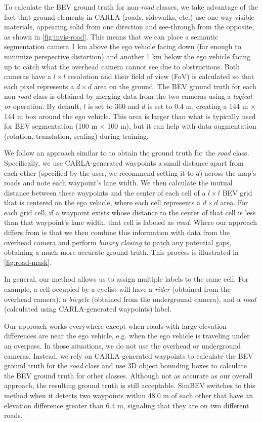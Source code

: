 To calculate the BEV ground truth for non-\textit{road} classes, we take advantage of the fact that ground elements in CARLA (roads, sidewalks, etc.) use one-way visible materials, appearing solid from one direction and see-through from the opposite, as shown in \cref{fig:invis-road}. This means that we can place a semantic segmentation camera 1 km above the ego vehicle facing down (far enough to minimize perspective distortion) and another 1 km below the ego vehicle facing up to catch what the overhead camera cannot see due to obstructions. Both cameras have a $l \times l$ resolution and their field of view (FoV) is calculated so that each pixel represents a $d \times d$ area on the ground. The BEV ground truth for each non-\textit{road} class is obtained by merging data from the two cameras using a \textit{logical or} operation. By default, $l$ is set to 360 and $d$ is set to 0.4 m, creating a 144 m $\times$ 144 m box around the ego vehicle. This area is larger than what is typically used for BEV segmentation (100 m $\times$ 100 m), but it can help with data augmentation (rotation, translation, scaling) during training.

We follow an approach similar to \cite{xu2022opv2v} to obtain the ground truth for the \textit{road} class. Specifically, we use CARLA-generated waypoints a small distance apart from each other (specified by the user, we recommend setting it to $d$) across the map's roads and note each waypoint's lane width. We then calculate the mutual distance between these waypoints and the center of each cell of a $l \times l$ BEV grid that is centered on the ego vehicle, where each cell represents a $d \times d$ area. For each grid cell, if a waypoint exists whose distance to the center of that cell is less than that waypoint's lane width, that cell is labeled as \textit{road}. Where our approach differs from \cite{xu2022opv2v} is that we then combine this information with data from the overhead camera and perform \textit{binary closing} to patch any potential gaps, obtaining a much more accurate ground truth. This process is illustrated in \cref{fig:road-mask}.

In general, our method allows us to assign multiple labels to the same cell. For example, a cell occupied by a cyclist will have a \textit{rider} (obtained from the overhead camera), a \textit{bicycle} (obtained from the underground camera), and a \textit{road} (calculated using CARLA-generated waypoints) label.

Our approach works everywhere except when roads with large elevation differences are near the ego vehicle, e.g. when the ego vehicle is traveling under an overpass. In those situations, we do not use the overhead or underground cameras. Instead, we rely on CARLA-generated waypoints to calculate the BEV ground truth for the \textit{road} class and use 3D object bounding boxes to calculate the BEV ground truth for other classes. Although not as accurate as our overall approach, the resulting ground truth is still acceptable. SimBEV switches to this method when it detects two waypoints within 48.0 m of each other that have an elevation difference greater than 6.4 m, signaling that they are on two different roads.

